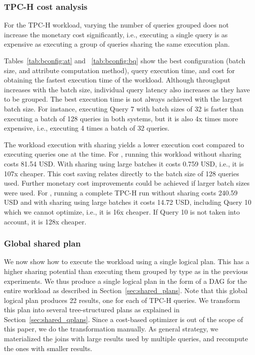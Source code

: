 \subsubsection{TPC-H cost analysis}
\label{sec:exp:tpch:cost_analysis}

For the TPC-H workload, varying the number of queries grouped does not
increase the monetary cost significantly, i.e.,
executing a single query is as expensive as executing a group of queries sharing
the same execution plan.

Tables~\ref{tab:bconfig:at} and ~\ref{tab:bconfig:bq} show the best
configuration (batch size, and \qset attribute computation method), query
execution time, and cost for obtaining the fastest execution time of the
workload. Although throughput increases with the batch size, individual query
latency also increases as they have to be grouped. The best execution
time is not always achieved with the largest batch size. For instance, executing
Query 7 with batch sizes of 32 is faster than executing a batch of 128
queries in both systems, but it is also 4x times more expensive, i.e.,
executing 4 times a batch of 32 queries.

The workload execution with sharing yields a lower execution cost
compared to executing queries one at the time.  For \athena, running this
workload  without sharing costs 81.54 USD. With sharing using large batches
it costs 0.759 USD, i.e., it is 107x cheaper. This cost saving relates directly
to the batch size of 128 queries used. Further monetary cost improvements could
be achieved if larger batch sizes were used. For \bigquery, running a complete
TPC-H run without sharing costs 240.59 USD and with sharing using large batches
it costs 14.72 USD, including  Query 10 which we cannot optimize, i.e., it is
16x cheaper. If Query 10 is not taken into account, it is 128x cheaper.

\subsubsection{Global shared plan}
\label{sec:exp:tpch:global_splan}


We now show how to execute the workload using a single logical plan.
This has a higher sharing potential than executing them grouped by
type as in the previous experiments.
We thus produce a single logical plan in the form
of a DAG for the entire workload as described in Section~\ref{sec:shared_plans}.
Note that this global logical plan produces 22 results,
one for each of TPC-H queries.
We transform this plan into several tree-structured plans as explained in
Section~\ref{sec:shared_qplans}. 
Since a cost-based optimizer is out of the scope of this paper,
we do the transformation manually.
As general strategy, we materialized the joins with large results used by multiple
    queries, and recompute the ones with smaller results.

